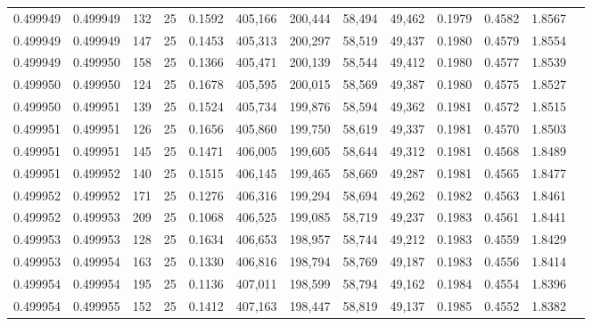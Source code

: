 \begin{tabular}{rrrrrrrrrrrrr}
0.499949 & 0.499949 & 132 &  25 &                                     0.1592 & 405,166 & 200,444 &  58,494 &  49,462 & 0.1979 & 0.4582 & 1.8567 \\
0.499949 & 0.499949 & 147 &  25 &                                     0.1453 & 405,313 & 200,297 &  58,519 &  49,437 & 0.1980 & 0.4579 & 1.8554 \\
0.499949 & 0.499950 & 158 &  25 &                                     0.1366 & 405,471 & 200,139 &  58,544 &  49,412 & 0.1980 & 0.4577 & 1.8539 \\
0.499950 & 0.499950 & 124 &  25 &                                     0.1678 & 405,595 & 200,015 &  58,569 &  49,387 & 0.1980 & 0.4575 & 1.8527 \\
0.499950 & 0.499951 & 139 &  25 &                                     0.1524 & 405,734 & 199,876 &  58,594 &  49,362 & 0.1981 & 0.4572 & 1.8515 \\
0.499951 & 0.499951 & 126 &  25 &                                     0.1656 & 405,860 & 199,750 &  58,619 &  49,337 & 0.1981 & 0.4570 & 1.8503 \\
0.499951 & 0.499951 & 145 &  25 &                                     0.1471 & 406,005 & 199,605 &  58,644 &  49,312 & 0.1981 & 0.4568 & 1.8489 \\
0.499951 & 0.499952 & 140 &  25 &                                     0.1515 & 406,145 & 199,465 &  58,669 &  49,287 & 0.1981 & 0.4565 & 1.8477 \\
0.499952 & 0.499952 & 171 &  25 &                                     0.1276 & 406,316 & 199,294 &  58,694 &  49,262 & 0.1982 & 0.4563 & 1.8461 \\
0.499952 & 0.499953 & 209 &  25 &                                     0.1068 & 406,525 & 199,085 &  58,719 &  49,237 & 0.1983 & 0.4561 & 1.8441 \\
0.499953 & 0.499953 & 128 &  25 &                                     0.1634 & 406,653 & 198,957 &  58,744 &  49,212 & 0.1983 & 0.4559 & 1.8429 \\
0.499953 & 0.499954 & 163 &  25 &                                     0.1330 & 406,816 & 198,794 &  58,769 &  49,187 & 0.1983 & 0.4556 & 1.8414 \\
0.499954 & 0.499954 & 195 &  25 &                                     0.1136 & 407,011 & 198,599 &  58,794 &  49,162 & 0.1984 & 0.4554 & 1.8396 \\
0.499954 & 0.499955 & 152 &  25 &                                     0.1412 & 407,163 & 198,447 &  58,819 &  49,137 & 0.1985 & 0.4552 & 1.8382 \\

\end{tabular}
